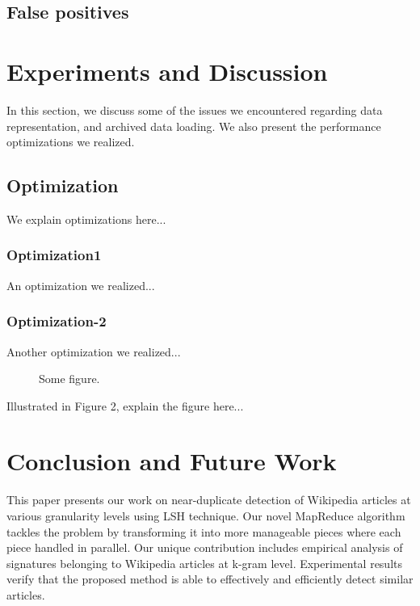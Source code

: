 \documentclass{acm_proc_article-sp}
\begin{document}
\subsection{False positives}

\begin{figure*}
\centering
{}
\caption{}
\label{ed-grid}
\end{figure*}


\section{Experiments and Discussion}
In this section, we discuss some of the issues we encountered regarding data representation, and archived data loading. We also present the performance optimizations we realized.

\subsection{Optimization}

We explain optimizations here...

\subsubsection{Optimization1}

An optimization we realized...

\subsubsection{Optimization-2}
Another optimization we realized...

\begin{figure*}
\centering
{}
\caption{Some figure.}
\end{figure*}

Illustrated in Figure 2, explain the figure here...

\section{Conclusion and Future Work}
This paper presents our work on near-duplicate detection of Wikipedia articles at various granularity levels using LSH technique. Our novel MapReduce algorithm tackles the problem by transforming it into more manageable pieces where each piece handled in parallel. Our unique contribution includes empirical analysis of signatures belonging to Wikipedia articles at k-gram level. Experimental results verify that the proposed method is able to effectively and efficiently detect similar articles.
\end{document}
